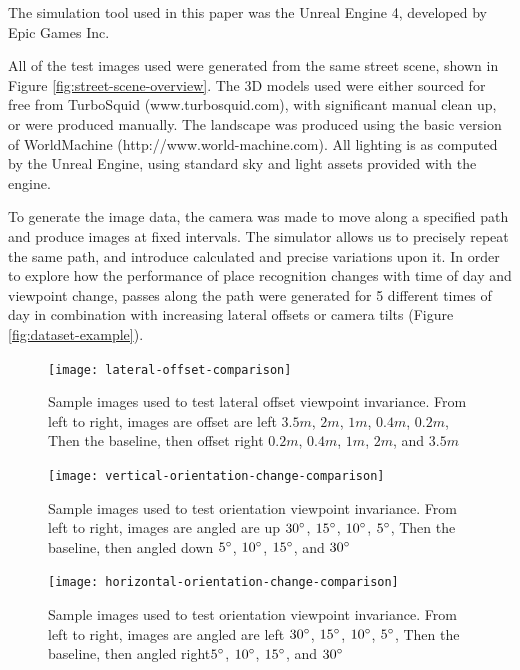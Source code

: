 \documentclass[letterpaper, 10 pt, conference]{ieeeconf}  %
\begin{document}
The simulation tool used in this paper was the Unreal Engine 4, developed by Epic Games Inc.

All of the test images used were generated from the same street scene, shown in Figure \ref{fig:street-scene-overview}. The 3D models used were either sourced for free from TurboSquid (www.turbosquid.com), with significant manual clean up, or were produced manually. The landscape was produced using the basic version of WorldMachine (http://www.world-machine.com). All lighting is as computed by the Unreal Engine, using standard sky and light assets provided with the engine.

To generate the image data, the camera was made to move along a specified path and produce images at fixed intervals.
The simulator allows us to precisely repeat the same path, and introduce calculated and precise variations upon it.
In order to explore how the performance of place recognition changes with time of day and viewpoint change, passes along the path were generated for 5 different times of day in combination with increasing lateral offsets or camera tilts (Figure \ref{fig:dataset-example}).

\begin{figure}[t]
    \texttt{[image: lateral-offset-comparison]}
    \caption{Sample images used to test lateral offset viewpoint invariance. From left to right, images are offset are left $3.5m$, $2m$, $1m$, $0.4m$, $0.2m$, Then the baseline, then offset right $0.2m$, $0.4m$, $1m$, $2m$, and $3.5m$}
    \label{fig:dataset-offset-example}
\end{figure}

\begin{figure}[t]
    \texttt{[image: vertical-orientation-change-comparison]}
    \caption{Sample images used to test orientation viewpoint invariance. From left to right, images are angled are up $30\degree$, $15\degree$, $10\degree$, $5\degree$, Then the baseline, then angled down $5\degree$, $10\degree$, $15\degree$, and $30\degree$}
    \label{fig:dataset-pitch-example}
\end{figure}

\begin{figure}[t]
    \texttt{[image: horizontal-orientation-change-comparison]}
    \caption{Sample images used to test orientation viewpoint invariance. From left to right, images are angled are left $30\degree$, $15\degree$, $10\degree$, $5\degree$, Then the baseline, then angled right$5\degree$, $10\degree$, $15\degree$, and $30\degree$}
    \label{fig:dataset-yaw-example}
\end{figure}
\end{document}
